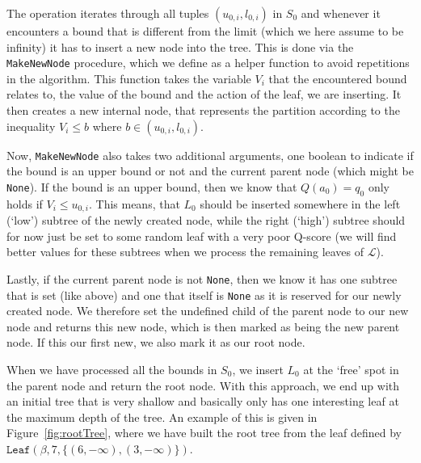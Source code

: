 \documentclass{article}
\begin{document}
The operation iterates through all tuples $(u_{0,i},l_{0,i})$ in $S_0$ and
whenever it encounters a bound that is different from the limit (which we here
assume to be infinity) it has to insert a new node into the tree. This is done
via the \texttt{MakeNewNode} procedure, which we define as a helper function to
avoid repetitions in the algorithm. This function takes the variable $V_i$ that
the encountered bound relates to, the value of the bound and the action of the
leaf, we are inserting. It then creates a new internal node, that represents
the partition according to the inequality $V_i \leq b$ where $b \in (u_{0,i},
l_{0,i})$.

Now, \texttt{MakeNewNode} also takes two additional arguments, one boolean to
indicate if the bound is an upper bound or not and the current parent node
(which might be \texttt{None}). If the bound is an upper bound, then we know
that $Q(a_0) = q_0$ only holds if $V_i \leq u_{0,i}$. This means, that $L_0$
should be inserted somewhere in the left (`low') subtree of the newly created
node, while the right (`high') subtree should for now just be set to some
random leaf with a very poor Q-score (we will find better values for these
subtrees when we process the remaining leaves of $\mathcal{L}$).

Lastly, if the current parent node is not \texttt{None}, then we know it has one
subtree that is set (like above) and one that itself is \texttt{None} as it is
reserved for our newly created node. We therefore set the undefined child of the
parent node to our new node and returns this new node, which is then marked as
being the new parent node. If this our first new, we also mark it as our root
node.

When we have processed all the bounds in $S_0$, we insert $L_0$ at the `free'
spot in the parent node and return the root node. With this approach, we end up
with an initial tree that is very shallow and basically only has one interesting
leaf at the maximum depth of the tree. An example of this is given in
Figure~\ref{fig:rootTree}, where we have built the root tree from the leaf
defined by $\texttt{Leaf}(\beta, 7, \{ (6, -\infty), (3, -\infty) \})$.
\end{document}
